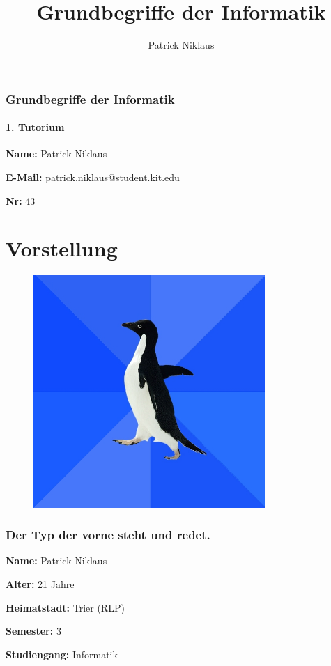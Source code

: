 \documentclass{beamer}
\title{Grundbegriffe der Informatik}
\author{Patrick Niklaus}
\begin{document}
\begin{frame}
  \frametitle{Grundbegriffe der Informatik}
  \framesubtitle{1. Tutorium}
  \begin{description}
    \item \textbf{Name:} Patrick Niklaus
    \item \textbf{E-Mail:} patrick.niklaus@student.kit.edu
    \item \textbf{Nr:} 43
  \end{description}
\end{frame}

\section{Vorstellung}
\begin{frame}[plain]
  \begin{figure}
    \begin{center}
      \includegraphics[width=250pt]{sap}
    \end{center}
  \end{figure}
\end{frame}

\begin{frame}
  \frametitle{Der Typ der vorne steht und redet.}
  \begin{description}
    \item \textbf{Name:} Patrick Niklaus
    \item \textbf{Alter:} 21 Jahre
    \item \textbf{Heimatstadt:} Trier (RLP)
    \item \textbf{Semester:} 3
    \item \textbf{Studiengang:} Informatik
  \end{description}
\end{frame}
\end{document}
